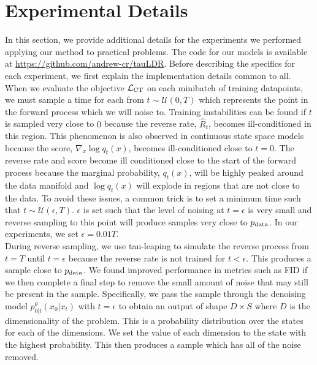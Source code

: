 \documentclass{article}
\begin{document}
\section{Experimental Details} \label{sec:ApdxExperimentDetails}
In this section, we provide additional details for the experiments we performed applying our method to practical problems. The code for our models is available at \url{https://github.com/andrew-cr/tauLDR}. Before describing the specifics for each experiment, we first explain the implementation details common to all.\\

When we evaluate the objective $\mathcal{L}_{\textup{CT}}$ on each minibatch of training datapoints, we must sample a time for each from $t \sim \mathcal{U}(0, T)$ which represents the point in the forward process which we will noise to. Training instabilities can be found if $t$ is sampled very close to $0$ because the reverse rate, $\hat{R}_t$, becomes ill-conditioned in this region. This phenomenon is also observed in continuous state space models because the score, $\nabla_x \log q_t(x)$, becomes ill-conditioned close to $t=0$. The reverse rate and score become ill conditioned close to the start of the forward process because the marginal probability, $q_t(x)$, will be highly peaked around the data manifold and $\log q_t(x)$ will explode in regions that are not close to the data. To avoid these issues, a common trick is to set a minimum time such that $t \sim \mathcal{U}(\epsilon, T)$. $\epsilon$ is set such that the level of noising at $t=\epsilon$ is very small and reverse sampling to this point will produce samples very close to $p_{\textup{data}}$. In our experiments, we set $\epsilon = 0.01T$.\\

During reverse sampling, we use tau-leaping to simulate the reverse process from $t=T$ until $t=\epsilon$ because the reverse rate is not trained for $t < \epsilon$. This produces a sample close to $p_{\textup{data}}$. We found improved performance in metrics such as FID if we then complete a final step to remove the small amount of noise that may still be present in the sample. Specifically, we pass the sample through the denoising model $p_{0|t}^\theta(x_0 | x_t)$ with $t=\epsilon$ to obtain an output of shape $D \times S$ where $D$ is the dimensionality of the problem. This is a probability distribution over the states for each of the dimensions. We set the value of each dimension to the state with the highest probability. This then produces a sample which has all of the noise removed.\\
\end{document}
